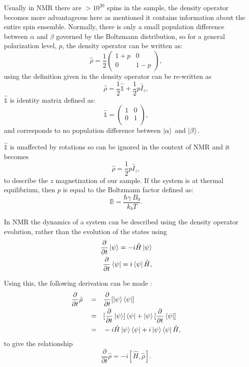 Usually in NMR there are $>10^{20}$ spins in the sample, the density operator becomes more advantageous here
as mentioned it contains information about the entire spin ensemble. Normally, there is only a small population difference between $\alpha$ and $\beta$
governed by the Boltzmann distribution,
so for a general polarization level, $p$, the density operator can be written as:
\begin{equation}
  \hat\rho = \frac{1}{2}\begin{pmatrix}
    1 + p & 0\\
    0 & 1 - p
\end{pmatrix},
\end{equation}
using the definition given in  the density operator can be re-written as
\begin{equation}
  \hat\rho = \frac{1}{2}\hat{\mathbb{1}} + \frac{1}{2}p\hat{I}_z,
\end{equation}
$\hat{\mathbb{1}}$ is identity matrix defined as:
\begin{equation}\label{eqn:1Def}
  \hat{\mathbb{1}} = \begin{pmatrix}
    1 & 0 \\
    0 & 1\\
\end{pmatrix},
\end{equation}
 and corresponds to no population difference between $\ket{\alpha}$ and $\ket{\beta}$.

$\hat{\mathbb{1}}$ is unaffected by rotations so can be ignored in the context of NMR
and it becomes
\begin{equation}
  \hat{\rho} = \frac{1}{2}p\hat{I}_z,
\end{equation}
to describe the $z$ magnetization of our sample. If the system is at thermal equilibrium,
then $p$ is equal to the Boltzmann factor defined as:
\begin{equation}\label{eqn:BDef}
  \mathbb{B} = \frac{\hbar\gamma~B_0}{k_bT}.
\end{equation}


In NMR the dynamics of a system can be described using the density operator evolution, rather than the evolution of the states using
\begin{align}
  \frac{\partial}{\partial{t}}\ket{\psi} = -i\hat{H}\ket{\psi}\\
  \frac{\partial}{\partial{t}}\bra{\psi} = i\bra{\psi}\hat{H},
\end{align}

Using this, the following derivation can be made \citep{Neumann2018}:
\begin{align}
  \frac{\partial}{\partial{t}}\hat\rho\quad=&\quad \frac{\partial}{\partial{t}}[\ket{\psi}\bra{\psi}]\\
  =&\quad[\frac{\partial}{\partial{t}}\ket{\psi}]\bra{\psi} + \ket{\psi}[\frac{\partial}{\partial{t}}\bra{\psi}]\\
  =&\quad-i\hat{H}\ket{\psi}\bra{\psi} + i\ket{\psi}\bra{\psi}\hat{H},
\end{align}
to give the relationship
\begin{equation}
  \frac{\partial}{\partial{t}}\hat\rho = -i[\hat{H},\hat\rho].
\end{equation}

